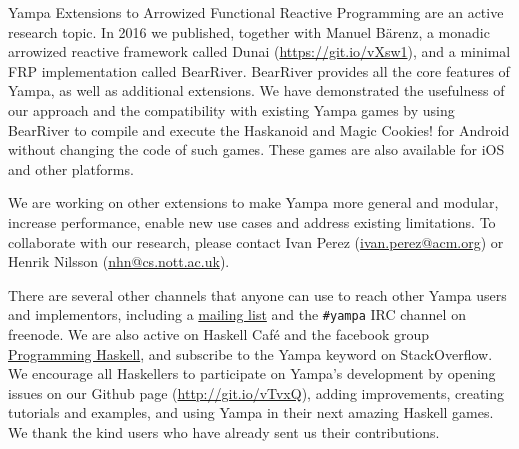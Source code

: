 \begin{hcarentry}[updated]{Yampa}
Extensions to Arrowized Functional Reactive Programming are an active research
topic. In 2016 we published, together with Manuel B\"arenz, a monadic
arrowized reactive framework called Dunai
(\href{https://git.io/vXsw1}{https://git.io/vXsw1}), and a minimal FRP
implementation called BearRiver. BearRiver provides all the core features of
Yampa, as well as additional extensions. We have demonstrated the usefulness
of our approach and the compatibility with existing Yampa games by using
BearRiver to compile and execute the Haskanoid and Magic Cookies! for Android
without changing the code of such games. These games are also available for
iOS and other platforms.

We are working on other extensions to make Yampa more general and modular,
increase performance, enable new use cases and address existing limitations. To
collaborate with our research, please contact Ivan Perez
(\href{mailto:ivan.perez@acm.org}{ivan.perez@acm.org}) or Henrik Nilsson
(\href{mailto:nhn@cs.nott.ac.uk}{nhn@cs.nott.ac.uk}).

There are several other channels that anyone can use to reach other Yampa users
and implementors, including a
\href{http://mailman.cs.yale.edu/mailman/listinfo/yampa-users}{mailing list}
and the \texttt{\#yampa} IRC channel on freenode. We are also active on Haskell
Caf\'e and the facebook group
\href{https://www.facebook.com/groups/programming.haskell/}{Programming
    Haskell}, and subscribe to the Yampa keyword on StackOverflow. We encourage
all Haskellers to participate on Yampa's development by opening issues on our
Github page (\href{http://git.io/vTvxQ}{http://git.io/vTvxQ}), adding
improvements, creating tutorials and examples, and using Yampa in their next
amazing Haskell games. We thank the kind users who have already sent us their
contributions.
\end{hcarentry}
